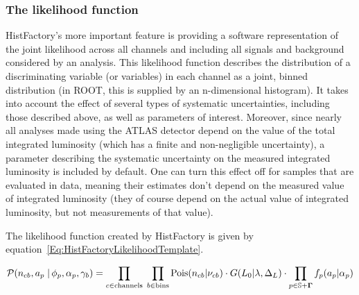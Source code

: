 \subsubsection{The likelihood function}

HistFactory's more important feature is providing a software representation of the joint likelihood across all channels and including all signals and background considered by an analysis.
This likelihood function describes the distribution of a discriminating variable (or variables) in each channel as a joint, binned distribution (in ROOT, this is supplied by an n-dimensional histogram).
It takes into account the effect of several types of systematic uncertainties, including those described above, as well as parameters of interest.
Moreover, since nearly all analyses made using the ATLAS detector depend on the value of the total integrated luminosity (which has a finite and non-negligible uncertainty),
a parameter describing the systematic uncertainty on the measured integrated luminosity is included by default.
One can turn this effect off for samples that are evaluated in data, meaning their estimates don't depend on the measured value of integrated luminosity (they of course depend on the actual value of integrated luminosity, but not measurements of that value).

The likelihood function created by HistFactory is given by equation~\ref{Eq:HistFactoryLikelihoodTemplate}.

\begin{eqnarray}
\label{Eq:HistFactoryLikelihoodTemplate}
\nonumber
{\cal P}( n_{cb}, a_p \; |\,\phi_p,\alpha_p,\gamma_b)=   \prod_{c\in \textrm{channels}} \; \prod_{b\in \textrm{bins}} \textrm{Pois}(n_{cb}|\nu_{cb}) \cdot G(L_0 | \lambda, \Delta_L) \cdot \prod_{p\in \mathbb{S}+\mathbf{\Gamma}} f_p(a_p|\alpha_p)
\end{eqnarray}

